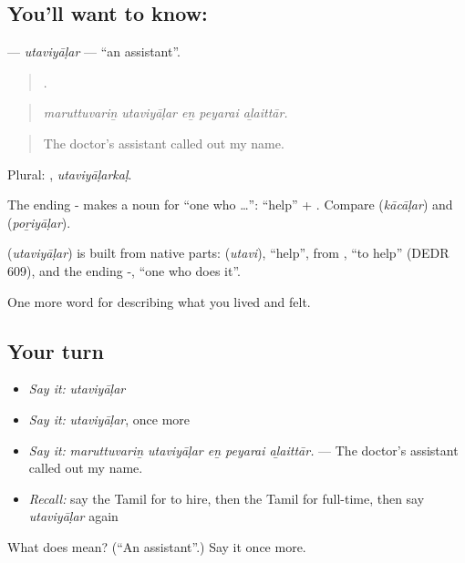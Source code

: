 \subsection*{You'll want to know: }
\textbf{} — \emph{utaviyāḷar} — \textquotedblleft{}an assistant\textquotedblright{}.

\begin{quote}
    .
\end{quote}

\begin{quote}
\emph{maruttuvariṉ utaviyāḷar eṉ peyarai aḻaittār.}
\end{quote}

\begin{quote}
The doctor's assistant called out my name.
\end{quote}

Plural: , \emph{utaviyāḷarkaḷ}.

The ending - makes a noun for \textquotedblleft{}one who …\textquotedblright{}:  \textquotedblleft{}help\textquotedblright{} + . Compare  (\emph{kācāḷar}) and  (\emph{poṟiyāḷar}).

\begin{cousinweb}
\textbf{} (\emph{utaviyāḷar}) is built from native parts:  (\emph{utavi}), \textquotedblleft{}help\textquotedblright{}, from , \textquotedblleft{}to help\textquotedblright{} (DEDR 609), and the ending -, \textquotedblleft{}one who does it\textquotedblright{}.
\end{cousinweb}

\begin{grammarlens}[title={What you've built}]
One more word for describing what you lived and felt.
\end{grammarlens}

\subsection*{Your turn}
\begin{itemize}
\raggedright
  \item \emph{Say it:} \emph{utaviyāḷar}
  \item \emph{Say it:} \emph{utaviyāḷar}, once more
  \item \emph{Say it:} \emph{maruttuvariṉ utaviyāḷar eṉ peyarai aḻaittār.} — The doctor's assistant called out my name.
  \item \emph{Recall:} say the Tamil for to hire, then the Tamil for full-time, then say \emph{utaviyāḷar} again
\end{itemize}

\begin{tcolorbox}[breakable,colback=teal!4,colframe=teal!35!black,title={Before you move on}]
What does  mean? (\textquotedblleft{}An assistant\textquotedblright{}.) Say it once more.
\end{tcolorbox}

